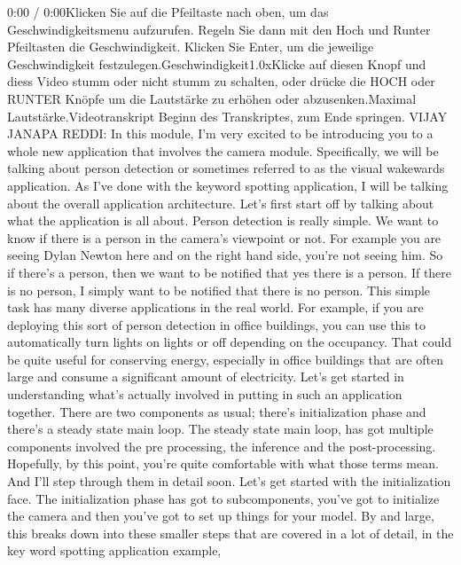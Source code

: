     0:00 / 0:00Klicken Sie auf die Pfeiltaste nach oben, um das Geschwindigkeitsmenu aufzurufen. Regeln Sie dann mit den Hoch und Runter Pfeiltasten die Geschwindigkeit. Klicken Sie Enter, um die jeweilige Geschwindigkeit festzulegen.Geschwindigkeit1.0xKlicke auf diesen Knopf und diess Video stumm oder nicht stumm zu schalten, oder drücke die HOCH oder RUNTER Knöpfe um die Lautstärke zu erhöhen oder abzusenken.Maximal Lautstärke.Videotranskript
    Beginn des Transkriptes, zum Ende springen.
    VIJAY JANAPA REDDI: In this module, I'm very
    excited to be introducing you to a whole new application that
    involves the camera module.
    Specifically, we will be talking about person detection
    or sometimes referred to as the visual wakewards application.
    As I've done with the keyword spotting application,
    I will be talking about the overall application architecture.
    Let's first start off by talking about what the application is all about.
    Person detection is really simple.
    We want to know if there is a person in the camera's viewpoint or not.
    For example you are seeing Dylan Newton here and on the right hand side,
    you're not seeing him.
    So if there's a person, then we want to be notified that yes there is a person.
    If there is no person, I simply want to be notified that there is no person.
    This simple task has many diverse applications in the real world.
    For example, if you are deploying this sort of person detection in office
    buildings, you can use this to automatically turn
    lights on lights or off depending on the occupancy.
    That could be quite useful for conserving energy,
    especially in office buildings that are often large
    and consume a significant amount of electricity.
    Let's get started in understanding what's
    actually involved in putting in such an application together.
    There are two components as usual; there's initialization phase
    and there's a steady state main loop.
    The steady state main loop, has got multiple components
    involved the pre processing, the inference and the post-processing.
    Hopefully, by this point, you're quite comfortable with what those terms mean.
    And I'll step through them in detail soon.
    Let's get started with the initialization face.
    The initialization phase has got to subcomponents,
    you've got to initialize the camera and then you've
    got to set up things for your model.
    By and large, this breaks down into these smaller steps that
    are covered in a lot of detail, in the key word spotting application example,

